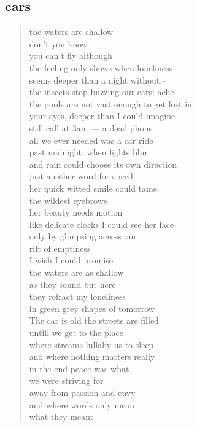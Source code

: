 \documentclass[11pt]{article}
\begin{document}
\subsection{cars}
\label{sec:orgc41a103}
\begin{verse}
the waters are shallow\\
don't you know\\
you can't fly although\\
the feeling only shows when loneliness\\
seems deeper than a  night without.--\\
the insects stop buzzing our ears; ache\\
the pools are not vast enough to get lost in\\
your eyes, deeper than I could  imagine\\
still call at 3am --- a dead phone\\
all we ever needed was a car ride\\
past midnight; when lights blur\\
and rain  could choose its own direction\\
just another word for speed\\
her quick witted smile could tame\\
the wildest eyebrows\\
\vspace*{1em}
her beauty needs  motion\\
like delicate clocks I could see her face\\
only by glimpsing across our\\
rift of emptiness\\
I wish I could promise\\
the waters are as shallow\\
as they sound but here\\
they refract my loneliness\\
in green grey shapes of tomorrow\\
\vspace*{1em}
The car is old the streets are filled\\
untill we get to the place\\
where streams lullaby us to sleep\\
and where nothing matters really\\
in the end peace was what\\
we were striving for\\
away from passion and envy\\
and where words only mean\\
what they meant\\
\end{verse}
\end{document}
